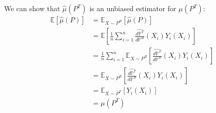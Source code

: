 \documentclass{article}
\begin{document}
We can show that $\hat{\mu}(P^T)$ is an unbiased estimator for $\mu(P^T)$:
\begin{align*}
    \mathbb{E}[\hat{\mu}(P)] &= \mathbb{E}_{X \sim P^R}[\hat{\mu}(P)] \\
    &= \mathbb{E}\left[\frac{1}{n} \sum_{i=1}^n \frac{\hat{d \mathbb{P}^T}}{d \mathbb{P}^R}(X_i)Y_i(X_i)\right] \\
    &=\frac{1}{n}\sum_{i=1}^n \mathbb{E}_{X \sim P^R}\left[\frac{\hat{d \mathbb{P}^T}}{d \mathbb{P}^R}(X_i)Y_i(X_i)\right] \\
    &= \mathbb{E}_{X \sim P^R}\left[\frac{\hat{d \mathbb{P}^T}}{d \mathbb{P}^R}(X_i)Y_i(X_i)\right] \\
    &=\mathbb{E}_{X \sim P^T}[Y_i(X_i)] \\
    &= \mu(P^T)
\end{align*}
\end{document}
